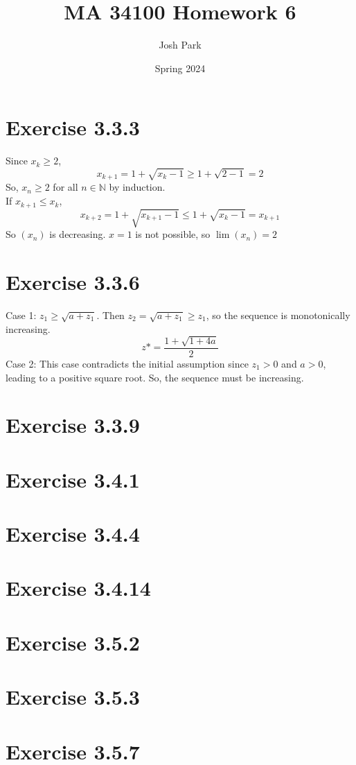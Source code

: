 \documentclass[11pt]{article}
\author{Josh Park}
\date{\vspace{-1em}Spring 2024}
\title{MA 34100 Homework 6\vspace{-1em}}
\newcommand{\N}{\mathbb{N}}  %
\newcommand{\xn}{(x_n)}
\begin{document}
    \maketitle
    \section*{Exercise 3.3.3}
    Since $x_k\geq 2$,
    \[ x_{k+1} = 1 + \sqrt{x_k-1}\geq 1+\sqrt{2-1}=2\]
    So, $x_n\geq 2$ for all $n\in\N$ by induction. \\
    If $x_{k+1}\leq x_k$,
    \[x_{k+2}=1+\sqrt{x_{k+1}-1}\leq 1+\sqrt{x_k-1}=x_{k+1}\]
    So $\xn$ is decreasing. $x=1$ is not possible, so $\lim \xn = 2$

    \section*{Exercise 3.3.6}
    Case 1: $z_1 \geq \sqrt{a+z_1}$. Then $z_2=\sqrt{a+z_1}\geq z_1$, so the sequence is monotonically increasing.
    \[z*=\frac{1+\sqrt{1+4a}}{2}\]
    Case 2:
    This case contradicts the initial assumption since $z_1>0$ and $a>0$, leading to a positive square root. So, the sequence must be increasing.

    \section*{Exercise 3.3.9}

    \section*{Exercise 3.4.1}
    \section*{Exercise 3.4.4}
    \section*{Exercise 3.4.14}

    \section*{Exercise 3.5.2}
    \section*{Exercise 3.5.3}
    \section*{Exercise 3.5.7}
\end{document}
